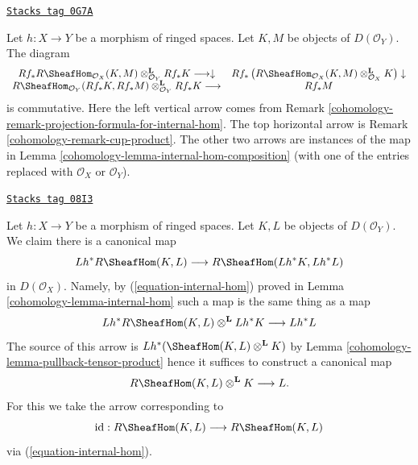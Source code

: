 \begin{remark}
\label{cohomology-remark-relative-cup-and-composition}
\href{https://stacks.math.columbia.edu/tag/0G7A}{\texttt{Stacks tag 0G7A}}

Let $h : X \to Y$ be a morphism of ringed spaces.
Let $K, M$ be objects of $D(\mathcal{O}_Y)$.
The diagram
$$
\begin{array}{cc}Rf_*R\SheafHom_{\mathcal{O}_X}(K, M)
\otimes_{\mathcal{O}_Y}^\mathbf{L} Rf_*K
\longrightarrow\downarrow & Rf_*\left(R\SheafHom_{\mathcal{O}_X}(K, M)
\otimes_{\mathcal{O}_X}^\mathbf{L} K\right)
\downarrow \\ R\SheafHom_{\mathcal{O}_Y}(Rf_*K, Rf_*M) \otimes_{\mathcal{O}_Y}^\mathbf{L}
Rf_*K \longrightarrow & Rf_*M\end{array}
$$
is commutative. Here the left vertical arrow comes from
Remark \ref{cohomology-remark-projection-formula-for-internal-hom}.
The top horizontal arrow is Remark \ref{cohomology-remark-cup-product}.
The other two arrows are instances of the map in
Lemma \ref{cohomology-lemma-internal-hom-composition} (with one of the entries
replaced with $\mathcal{O}_X$ or $\mathcal{O}_Y$).
\end{remark}

\begin{remark}
\label{cohomology-remark-prepare-fancy-base-change}
\href{https://stacks.math.columbia.edu/tag/08I3}{\texttt{Stacks tag 08I3}}

Let $h : X \to Y$ be a morphism of ringed spaces.
Let $K, L$ be objects of $D(\mathcal{O}_Y)$. We claim there is a
canonical map
$$
Lh^*R\SheafHom(K, L) \longrightarrow R\SheafHom(Lh^*K, Lh^*L)
$$
in $D(\mathcal{O}_X)$. Namely, by (\ref{equation-internal-hom})
proved in Lemma \ref{cohomology-lemma-internal-hom}
such a map is the same thing as a map
$$
Lh^*R\SheafHom(K, L) \otimes^\mathbf{L} Lh^*K \longrightarrow Lh^*L
$$
The source of this arrow is $Lh^*(\SheafHom(K, L) \otimes^\mathbf{L} K)$
by Lemma \ref{cohomology-lemma-pullback-tensor-product}
hence it suffices to construct a canonical map
$$
R\SheafHom(K, L) \otimes^\mathbf{L} K \longrightarrow L.
$$
For this we take the arrow corresponding to
$$
\text{id} :
R\SheafHom(K, L)
\longrightarrow
R\SheafHom(K, L)
$$
via (\ref{equation-internal-hom}).
\end{remark}


